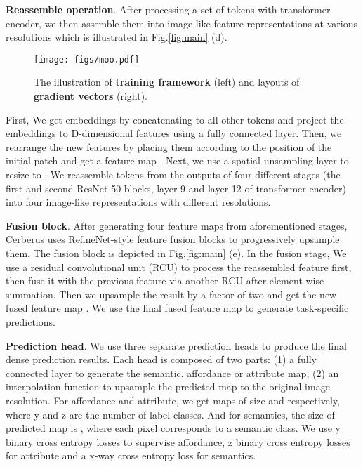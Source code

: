 \documentclass[10pt,twocolumn,letterpaper]{article}
\begin{document}
\textbf{Reassemble operation}. After processing a set of tokens   with transformer encoder, we then assemble them into image-like feature representations at various resolutions which is illustrated in Fig.\ref{fig:main} (d). 

\begin{figure*}[t]
	\centering
	\texttt{[image: figs/moo.pdf]}
	\caption{The illustration of \textbf{training framework} (left) and layouts of \textbf{gradient vectors} (right). }
	\label{fig:moo} 
\end{figure*}

First, We get  embeddings by concatenating  to all other tokens and project the embeddings to D-dimensional features using a fully connected layer. Then, we rearrange the new  features by placing them according to the position of the initial patch and get a feature map . Next, we use a spatial unsampling layer to resize  to . We reassemble tokens from the outputs of four different stages (the first and second ResNet-50 blocks, layer 9 and layer 12 of transformer encoder) into four image-like representations with different resolutions.

\textbf{Fusion block}. After generating four feature maps from aforementioned stages, Cerberus uses RefineNet-style\cite{lin2017refinenet} feature fusion blocks to progressively upsample them. The fusion block is depicted in Fig.\ref{fig:main} (e). In the  fusion stage, We use a residual convolutional unit (RCU) to process the reassembled feature  first, then fuse it with the previous feature  via another RCU after element-wise summation. Then we upsample the result by a factor of two and get the new fused feature map . We use the final fused feature map to generate task-specific predictions.

\textbf{Prediction head}. 
We use three separate prediction heads to produce the final dense prediction results. Each head is composed of two parts: (1) a fully connected layer to generate the semantic, affordance or attribute map, (2) an interpolation function to upsample the predicted map to the original image resolution. For affordance and attribute, we get maps of size  and   respectively, where y and z are the number of label classes. And for semantics, the size of predicted map is , where each pixel corresponds to a semantic class. We use y binary cross entropy losses to supervise affordance, z binary cross entropy losses for attribute and a x-way cross entropy loss for semantics.
\end{document}

